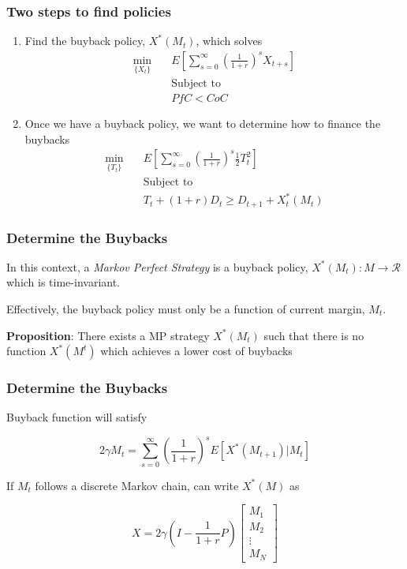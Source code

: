 \documentclass[10pt]{beamer}
\begin{document}
  \begin{frame} \frametitle{Two steps to find policies}

    \begin{enumerate}
      \item Find the buyback policy, $X^*(M_t)$, which solves
        \begin{align*}
          \min_{\{X_t\}} \quad &E \left[ \sum_{s=0}^{\infty} \left(\frac{1}{1 + r}\right)^s X_{t+s} \right] \\
          &\text{Subject to } \\
          &PfC < CoC
        \end{align*}
      \item Once we have a buyback policy, we want to determine how to finance the buybacks
        \begin{align*}
          \min_{\{T_t\}} \quad &E \left[ \sum_{s=0}^{\infty} \left(\frac{1}{1 + r}\right)^s \frac{1}{2} T_t^2 \right] \\
          &\text{Subject to } \\
          &T_t + (1 + r) D_t \geq D_{t+1} + X_t^*(M_t)
        \end{align*}
    \end{enumerate}

  \end{frame}

  \begin{frame} \frametitle{Determine the Buybacks}

    In this context, a \textit{Markov Perfect Strategy} is a buyback policy,
    $X^*(M_t) : M \rightarrow \mathcal{R}$ which is time-invariant.

    \vspace{0.25cm}

    Effectively, the buyback policy must only be a function of current margin, $M_t$.

    \vspace{0.25cm}

    \textbf{Proposition}: There exists a MP strategy $X^*(M_t)$ such that there is no function
    $X^*(M^t)$ which achieves a lower cost of buybacks

  \end{frame}

  \begin{frame} \frametitle{Determine the Buybacks}

    Buyback function will satisfy

    $$2 \gamma M_t = \sum_{s=0}^{\infty} \left( \frac{1}{1+r} \right)^s E \left[X^*(M_{t+1}) | M_t \right]$$

    If $M_t$ follows a discrete Markov chain, can write $X^*(M)$ as

    $$X = 2 \gamma \left(I - \frac{1}{1+r} P \right) \begin{bmatrix} M_1 \\ M_2 \\ \vdots \\ M_N \end{bmatrix}$$

  \end{frame}
\end{document}
